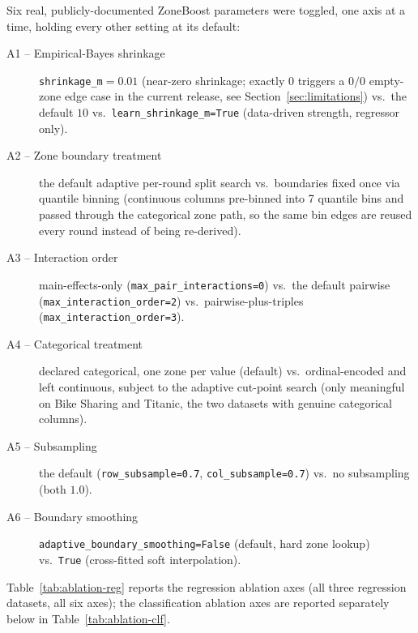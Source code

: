 \documentclass[11pt]{article}
\begin{document}
Six real, publicly-documented ZoneBoost parameters were toggled, one axis
at a time, holding every other setting at its default:

\begin{description}
  \item[A1 -- Empirical-Bayes shrinkage] \texttt{shrinkage\_m}$=0.01$
    (near-zero shrinkage; exactly $0$ triggers a $0/0$ empty-zone edge case
    in the current release, see Section~\ref{sec:limitations}) vs.\ the
    default $10$ vs.\ \texttt{learn\_shrinkage\_m=True} (data-driven
    strength, regressor only).
  \item[A2 -- Zone boundary treatment] the default adaptive per-round split
    search vs.\ boundaries fixed once via quantile binning (continuous
    columns pre-binned into 7 quantile bins and passed through the
    categorical zone path, so the same bin edges are reused every round
    instead of being re-derived).
  \item[A3 -- Interaction order] main-effects-only
    (\texttt{max\_pair\_interactions=0}) vs.\ the default pairwise
    (\texttt{max\_interaction\_order=2}) vs.\ pairwise-plus-triples
    (\texttt{max\_interaction\_order=3}).
  \item[A4 -- Categorical treatment] declared categorical, one zone per
    value (default) vs.\ ordinal-encoded and left continuous, subject to
    the adaptive cut-point search (only meaningful on Bike Sharing and
    Titanic, the two datasets with genuine categorical columns).
  \item[A5 -- Subsampling] the default (\texttt{row\_subsample=0.7},
    \texttt{col\_subsample=0.7}) vs.\ no subsampling (both $1.0$).
  \item[A6 -- Boundary smoothing]
    \texttt{adaptive\_boundary\_smoothing=False} (default, hard zone
    lookup) vs.\ \texttt{True} (cross-fitted soft interpolation).
\end{description}

Table~\ref{tab:ablation-reg} reports the regression ablation axes (all
three regression datasets, all six axes); the classification ablation axes
are reported separately below in Table~\ref{tab:ablation-clf}.
\end{document}
